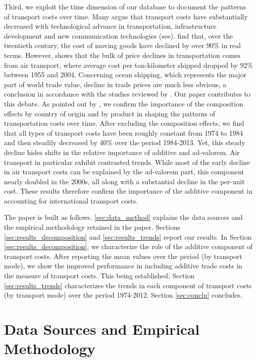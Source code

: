 \documentclass[a4paper,11pt]{article}
\begin{document}
Third, we exploit the time dimension of our database to document the patterns of transport costs over time. Many argue that transport costs have substantially decreased with technological advance in transportation, infrastructure development and new communication technologies (see\citealp{Lafourcade_Thisse}). \cite{Glaeser04} find that, over the twentieth century, the cost of moving goods have declined by over 90\% in real terms. However, \cite{hummels2007} shows that the bulk of price declines in transportation comes from air transport, where average cost per ton-kilometer shipped dropped by 92\% between 1955 and 2004. Concerning ocean shipping, which represents the major part of world trade value, decline in trade prices are much less obvious, a conclusion in accordance with the studies reviewed by \cite{Behar_Venables}. Our paper contributes to this debate. As pointed out by \cite{hummels2007}, we confirm the importance of the composition effects by country of origin and by product in shaping the patterns of transportation costs over time. After excluding the composition effects, we find that all types of transport costs have been roughly constant from 1974 to 1984 and then steadily decreased by 40\% over the period 1984-2013. Yet, this steady decline hides shifts in the relative importance of additive and ad-valorem. Air transport in particular exhibit contrasted trends. While most of the early decline in air transport costs can be explained by the ad-valorem part, this component nearly doubled in the 2000s, all along with a substantial decline in the per-unit cost. These results therefore confirm the importance of the additive component in accounting for international transport costs.\smallskip

The paper is built as follows. \ref{sec:data_method} explains the data sources and the empirical methodology retained in the paper. Sections \ref{sec:results_decomposition} and \ref{sec:results_trends} report our results. In Section \ref{sec:results_decomposition}, we characterize the role of the additive component of transport costs. After reporting the mean values over the period (by transport mode), we show the improved performance in including additive trade costs in the measure of transport costs. This being established, Section \ref{sec:results_trends} characterizes the trends in each component of transport costs (by transport mode) over the period 1974-2012. Section \ref{sec:conclu} concludes.

\section{Data Sources and Empirical Methodology \label{sec:data_method}}
\end{document}

